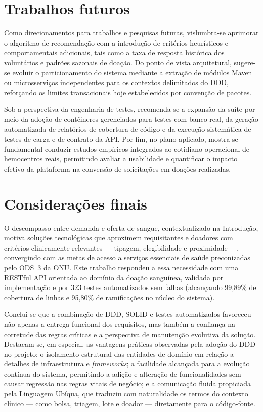 \section{Trabalhos futuros}

Como direcionamentos para trabalhos e pesquisas futuras, vislumbra-se aprimorar o algoritmo de recomendação com a introdução de critérios heurísticos e comportamentais adicionais, tais como a taxa de resposta histórica dos voluntários e padrões sazonais de doação. Do ponto de vista arquitetural, sugere-se evoluir o particionamento do sistema mediante a extração de módulos Maven ou microsserviços independentes para os contextos delimitados do DDD, reforçando os limites transacionais hoje estabelecidos por convenção de pacotes.

Sob a perspectiva da engenharia de testes, recomenda-se a expansão da suíte por meio da adoção de contêineres gerenciados para testes com banco real, da geração automatizada de relatórios de cobertura de código e da execução sistemática de testes de carga e de contrato da API. Por fim, no plano aplicado, mostra-se fundamental conduzir estudos empíricos integrados ao cotidiano operacional de hemocentros reais, permitindo avaliar a usabilidade e quantificar o impacto efetivo da plataforma na conversão de solicitações em doações realizadas.

\section{Considerações finais}

O descompasso entre demanda e oferta de sangue, contextualizado na Introdução, motiva soluções tecnológicas que aproximem requisitantes e doadores com critérios clinicamente relevantes --- tipagem, elegibilidade e proximidade ---, convergindo com as metas de acesso a serviços essenciais de saúde preconizadas pelo ODS~3 da ONU. Este trabalho respondeu a essa necessidade com uma RESTful API orientada ao domínio da doação sanguínea, validada por implementação e por 323 testes automatizados sem falhas (alcançando 99,89\% de cobertura de linhas e 95,80\% de ramificações no núcleo do sistema).

Conclui-se que a combinação de DDD, SOLID e testes automatizados favoreceu não apenas a entrega funcional dos requisitos, mas também a confiança na corretude das regras críticas e a perspectiva de manutenção evolutiva da solução. Destacam-se, em especial, as vantagens práticas observadas pela adoção do DDD no projeto: o isolamento estrutural das entidades de domínio em relação a detalhes de infraestrutura e \textit{frameworks}; a facilidade alcançada para a evolução contínua do sistema, permitindo a adição e alteração de funcionalidades sem causar regressão nas regras vitais de negócio; e a comunicação fluida propiciada pela Linguagem Ubíqua, que traduziu com naturalidade os termos do contexto clínico --- como bolsa, triagem, lote e doador --- diretamente para o código-fonte.

